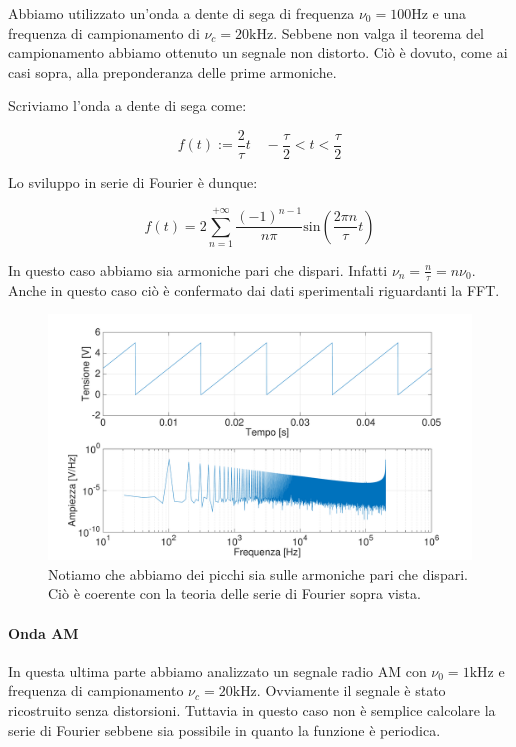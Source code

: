 Abbiamo utilizzato un'onda a dente di sega di frequenza $\nu_0=100 \si{\hertz}$ e una frequenza di campionamento di $\nu_c=20\si{\kilo\hertz}$. Sebbene non valga il teorema del campionamento abbiamo ottenuto un segnale non distorto. Ciò è dovuto, come ai casi sopra, alla preponderanza delle prime armoniche.

Scriviamo l'onda a dente di sega come: 

$$f(t):= \frac{2}{\tau}t \quad -\frac{\tau}{2}<t<\frac{\tau}{2}$$

Lo sviluppo in serie di Fourier è dunque:

\begin{equation}
f(t)=2\sum_{n=1}^{+\infty}\frac{(-1)^{n-1}}{n\pi}\mathrm{sin} \left(\frac{2\pi n}{\tau}t\right)
\end{equation}

In questo caso abbiamo sia armoniche pari che dispari. Infatti $\nu_n=\frac{n}{\tau}=n\nu_0$. Anche in questo caso ciò è confermato dai dati sperimentali riguardanti la FFT. 

\begin{figure}[H]
\centering
	\includegraphics[width=.63\textwidth]{../E13/latex/sega100hz@10000,200000.pdf}
	\caption{Notiamo che abbiamo dei picchi sia sulle armoniche pari che dispari. Ciò è coerente con la teoria delle serie di Fourier sopra vista.}
	\label{sega}
\end{figure}

\paragraph{Onda AM \newline}

In questa ultima parte abbiamo analizzato un segnale radio AM con $\nu_0=1\si{\kilo\hertz}$ e frequenza di campionamento $\nu_c=20\si{\kilo\hertz}$. Ovviamente il segnale è stato ricostruito senza distorsioni. Tuttavia in questo caso non è semplice calcolare la serie di Fourier sebbene sia possibile in quanto la funzione è periodica. 

